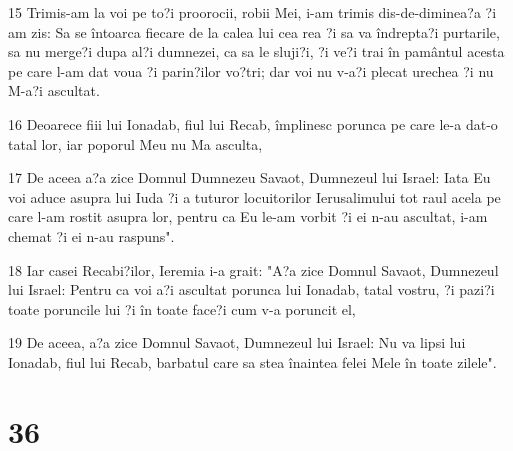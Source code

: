\par 15 Trimis-am la voi pe to?i proorocii, robii Mei, i-am trimis dis-de-diminea?a ?i am zis: Sa se întoarca fiecare de la calea lui cea rea ?i sa va îndrepta?i purtarile, sa nu merge?i dupa al?i dumnezei, ca sa le sluji?i, ?i ve?i trai în pamântul acesta pe care l-am dat voua ?i parin?ilor vo?tri; dar voi nu v-a?i plecat urechea ?i nu M-a?i ascultat.
\par 16 Deoarece fiii lui Ionadab, fiul lui Recab, împlinesc porunca pe care le-a dat-o tatal lor, iar poporul Meu nu Ma asculta,
\par 17 De aceea a?a zice Domnul Dumnezeu Savaot, Dumnezeul lui Israel: Iata Eu voi aduce asupra lui Iuda ?i a tuturor locuitorilor Ierusalimului tot raul acela pe care l-am rostit asupra lor, pentru ca Eu le-am vorbit ?i ei n-au ascultat, i-am chemat ?i ei n-au raspuns".
\par 18 Iar casei Recabi?ilor, Ieremia i-a grait: "A?a zice Domnul Savaot, Dumnezeul lui Israel: Pentru ca voi a?i ascultat porunca lui Ionadab, tatal vostru, ?i pazi?i toate poruncile lui ?i în toate face?i cum v-a poruncit el,
\par 19 De aceea, a?a zice Domnul Savaot, Dumnezeul lui Israel: Nu va lipsi lui Ionadab, fiul lui Recab, barbatul care sa stea înaintea felei Mele în toate zilele".

\chapter{36}

